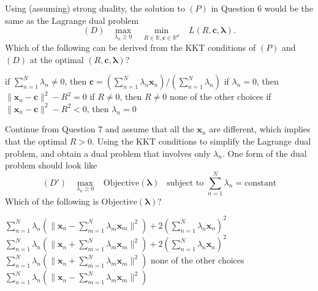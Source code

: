 \documentclass[a4paper,10pt]{exam}
\begin{document}
\begin{questions}
	\question Using (assuming) strong duality, the solution to $(P)$ in Question 6 would be the same as the Lagrange dual problem
	\[(D) \; \; \; \max_{\lambda_n \ge 0} \;\;\; \min_{R \in \mathbb{R}, \mathbf{c} \in \mathbb{R}^d}  \;\;\;  L(R, \mathbf{c}, {\boldsymbol\lambda}).\]
	Which of the following can be derived from the KKT conditions of $(P)$ and $(D)$ at the optimal $(R, \mathbf{c}, {\boldsymbol\lambda})$?
	\begin{checkboxes}
		\CorrectChoice if $\sum_{n=1}^N \lambda_n \neq 0$, then $\mathbf{c} = \left(\sum_{n=1}^N \lambda_n \mathbf{x}_n\right) \Big/ \left(\sum_{n=1}^N \lambda_n\right)$
		\choice if $\lambda_n = 0$, then $\|\mathbf{x}_n - \mathbf{c}\|^2 - R^2 = 0$
		\CorrectChoice if $R \neq 0$, then $R \neq 0$
		\choice none of the other choices
		\choice if $\|\mathbf{x}_n - \mathbf{c}\|^2 - R^2 < 0$, then $\lambda_n = 0$\\
   \end{checkboxes}
   
   \question Continue from Question 7 and assume that all the $\mathbf{x}_n$ are different, which implies that the optimal $R>0$. Using the KKT conditions to simplify the Lagrange dual problem, and obtain a dual problem that involves only $\lambda_n$. One form of the dual problem should look like
   \[(D') \; \; \; \max_{\lambda_n \ge 0} \; \; \; \mbox{Objective}(\boldsymbol\lambda) \; \; \; \mbox{subject to } \sum_{n=1}^N \lambda_n = \mbox{constant}\]
   Which of the following is $\mbox{Objective}(\boldsymbol\lambda)$?
   
   \begin{checkboxes}
   	 \choice $\sum_{n=1}^N \lambda_n (\|\mathbf{x}_n - \sum_{m=1}^N \lambda_m \mathbf{x}_m \|^2) + 2(\sum_{n=1}^N \lambda_n \mathbf{x}_n)^2$
   	 \choice $\sum_{n=1}^N \lambda_n (\|\mathbf{x}_n + \sum_{m=1}^N \lambda_m \mathbf{x}_m \|^2) + 2(\sum_{n=1}^N \lambda_n \mathbf{x}_n)^2$
   	 \choice $\sum_{n=1}^N \lambda_n (\|\mathbf{x}_n + \sum_{m=1}^N \lambda_m \mathbf{x}_m \|^2)$
   	 \choice none of the other choices
   	 \CorrectChoice $\sum_{n=1}^N \lambda_n (\|\mathbf{x}_n - \sum_{m=1}^N \lambda_m \mathbf{x}_m \|^2)$\\
   \end{checkboxes}
   

\end{questions}
\end{document}
